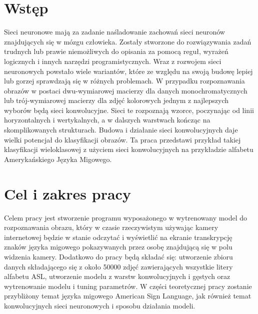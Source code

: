 \documentclass[a4paper,12pt,oneside]{book} %
\begin{document}
\sloppy
\thispagestyle{empty}

\newpage{}

\thispagestyle{empty}
\newpage{}

\tableofcontents{}

\chapter*{Wstęp}
\label{Wstep}
Sieci neuronowe mają za zadanie naśladowanie zachowań sieci neuronów znajdujących się w mózgu człowieka. Zostały stworzone do rozwiązywania zadań trudnych lub prawie niemożliwych do opisania za pomocą reguł, wyrażeń logicznych i innych narzędzi programistycznych. Wraz z rozwojem sieci neuronowych powstało wiele wariantów, które ze względu na swoją budowę lepiej lub gorzej sprawdzają się w różnych problemach. W przypadku rozpoznawania obrazów w postaci dwu-wymiarowej macierzy dla danych monochromatycznych lub trój-wymiarowej macierzy dla zdjęć kolorowych jednym z najlepszych wyborów będą sieci konwolucyjne. Sieci te rozpoznają wzorce, poczynając od linii horyzontalnych i wertykalnych, a w dalszych warstwach kończąc na skomplikowanych strukturach. Budowa i działanie sieci konwolucyjnych daje wielki potencjał do klasyfikacji obrazów. Ta praca przedstawi przykład takiej klasyfikacji wieloklasowej z użyciem sieci konwolucyjnych na przykładzie alfabetu Amerykańskiego Języka Migowego. 

\chapter*{Cel i zakres pracy}
\label{Cel i zakres pracy}
Celem pracy jest stworzenie programu wyposażonego w wytrenowany model do rozpoznawania obrazu, który w czasie rzeczywistym używając kamery internetowej będzie w stanie odczytać i wyświetlić na ekranie transkrypcję znaków języka migowego pokazywanych przez osobę znajdującą się w polu widzenia kamery. Dodatkowo do pracy będą składać się: utworzenie zbioru danych składającego się z około 50000 zdjęć zawierających wszystkie litery alfabetu ASL, utworzenie modelu z warstw konwolucyjnych i gęstych oraz wytrenowanie modelu i tuning parametrów. W części teoretycznej pracy zostanie przybliżony temat języka migowego American Sign Language, jak również temat konwolucyjnych sieci neuronowych i sposobu działania modeli.
\end{document}

